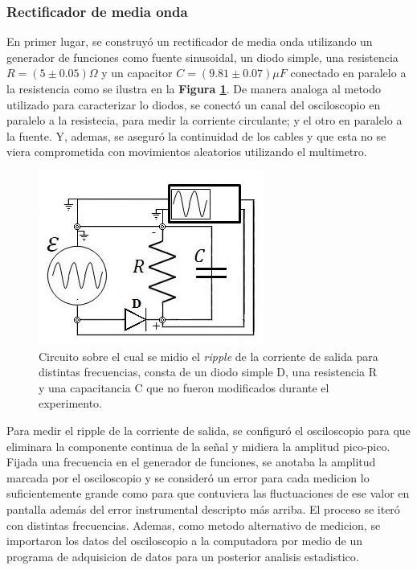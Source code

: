\documentclass[11pt,a4paper]{article}
\begin{document}
\subsubsection{Rectificador de media onda}
En primer lugar, se construyó un rectificador de media onda utilizando un generador de funciones como fuente sinusoidal, un diodo simple, una resistencia $R = (5 \pm 0.05)\Omega$ y un capacitor $C = (9.81 \pm 0.07)\mu F$ conectado en paralelo a la resistencia como se ilustra en la \textbf{Figura \ref{fig:Re-M-O}}. De manera analoga al metodo utilizado para caracterizar lo diodos, se conectó un canal del osciloscopio en paralelo a la resistecia, para medir la corriente circulante; y el otro en paralelo a la fuente. Y, ademas, se aseguró la continuidad de los cables y que esta no se viera comprometida con movimientos aleatorios utilizando el multimetro.

\begin{figure}[H]
\centering
\includegraphics[scale=0.8]{Rectificador-Media-Onda}
   \caption{Circuito sobre el cual se midio el \textit{ripple} de la corriente de salida para distintas frecuencias, consta de un diodo simple D, una resistencia R y una capacitancia C que no fueron modificados durante el experimento. }
   \label{fig:Re-M-O}
\end{figure}

Para medir el ripple de la corriente de salida, se configuró el osciloscopio para que eliminara la componente continua de la señal y midiera la amplitud pico-pico. Fijada una frecuencia en el generador de funciones, se anotaba la amplitud marcada por el osciloscopio y se consideró un error para cada medicion lo suficientemente grande como para que contuviera las fluctuaciones de ese valor en pantalla además del error instrumental descripto más arriba. El proceso se iteró con distintas frecuencias.  Ademas, como metodo alternativo de medicion, se importaron los datos del osciloscopio a la computadora por medio de un programa de adquisicion de datos para un posterior analisis estadistico.
\end{document}
